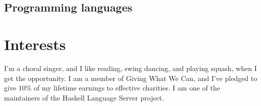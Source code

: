 \documentclass[12pt,a4paper,sans]{moderncv}
\begin{document}
\subsection{Programming languages}


\section{Interests}
I'm a choral singer, and I like reading, swing dancing, and playing squash, when I get the opportunity. 
I am a member of Giving What We Can, and I've pledged to give 10\% of my lifetime earnings to effective charities.
I am one of the maintainers of the Haskell Language Server project.

\newpage
\nocite{*}
\printbibliography[title={Publications}]
\end{document}

